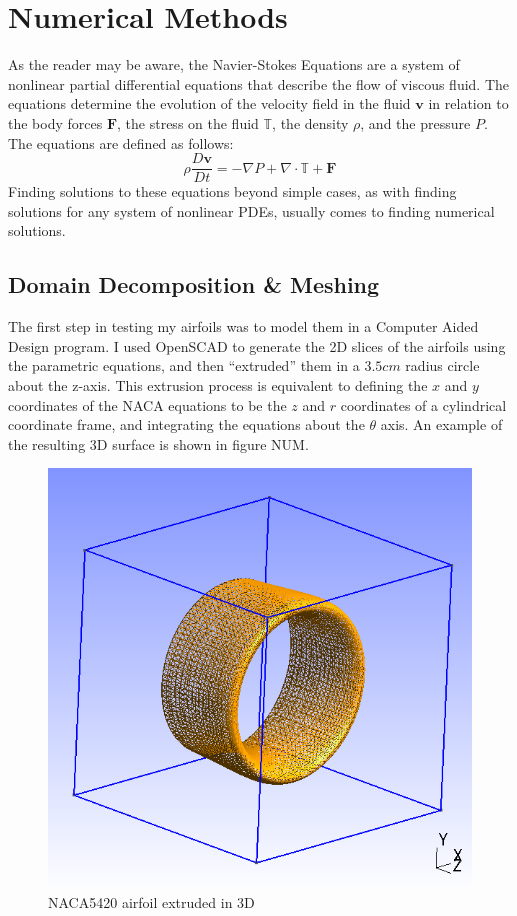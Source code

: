 \documentclass[12pt]{article}
\begin{document}
\section{Numerical Methods}
As the reader may be aware, the Navier-Stokes Equations are a system of 
nonlinear partial differential equations that describe the flow of viscous
fluid.  The equations determine the evolution of the velocity field in the
fluid $\mathbf{v}$ in relation to the body forces $\mathbf{F}$, the stress 
on the fluid $\mathbb{T}$, the density $\rho$, and the pressure $P$.  The
equations are defined as follows:
$$\rho\frac{D\mathbf{v}}{Dt} = -\nabla P +\nabla\cdot\mathbb{T}+\mathbf{F}$$
Finding solutions to these equations beyond simple cases,
as with finding solutions for any system of nonlinear PDEs, usually comes to
finding numerical solutions.

\subsection{Domain Decomposition \& Meshing}
The first step in testing my airfoils was to model them in a Computer Aided
Design program.  I used OpenSCAD to generate the 2D slices of the airfoils
using the parametric equations, and then ``extruded'' them in a $3.5cm$ radius
circle about the z-axis.  This extrusion process is equivalent to defining
the $x$ and $y$ coordinates of the NACA equations to be the $z$ and $r$ 
coordinates of a cylindrical coordinate frame, and integrating the equations 
about the $\theta$ axis.  An example of the resulting 3D surface is shown in
figure NUM.

\begin{figure}[H]
\centering
\includegraphics[width=6in]{../images/NACA5420.png}
\caption{NACA5420 airfoil extruded in 3D}
\end{figure}
\end{document}
